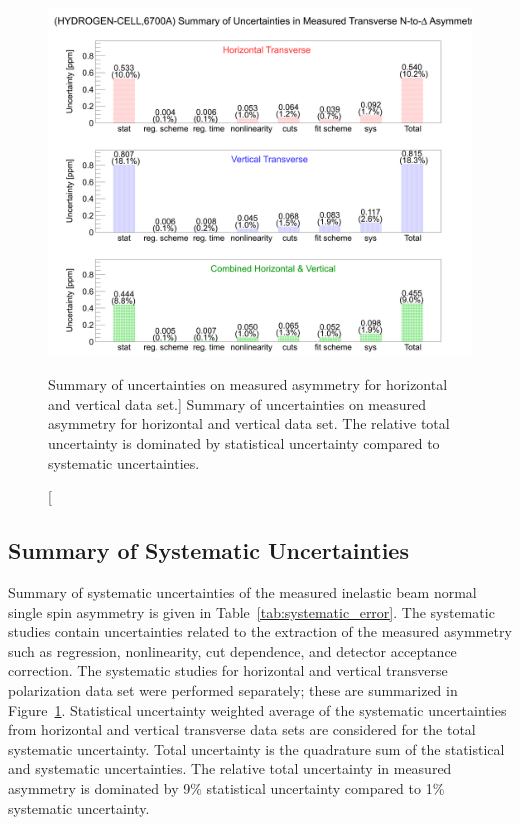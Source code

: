 \begin{figure}[!h]
	\begin{center}
	\includegraphics[width=15.0cm]{figures/errorChart}
	\end{center}
	\caption
	[Summary of uncertainties on measured asymmetry for horizontal and vertical data set.]
	{Summary of uncertainties on measured asymmetry for horizontal and vertical data set. The relative total uncertainty is dominated by statistical uncertainty compared to systematic uncertainties.}
	\label{fig:errorChart}
\end{figure}

\subsection{Summary of Systematic Uncertainties}
\label{Summary of Systematic Uncertainties}
Summary of systematic uncertainties of the measured inelastic beam normal single spin asymmetry is given in Table~\ref{tab:systematic_error}. The systematic studies contain uncertainties related to the extraction of the measured asymmetry such as regression, nonlinearity, cut dependence, and detector acceptance correction. The systematic studies for horizontal and vertical transverse polarization data set were performed separately; these are summarized in Figure~\ref{fig:errorChart}. Statistical uncertainty weighted average of the systematic uncertainties from horizontal and vertical transverse data sets are considered for the total systematic uncertainty. Total uncertainty is the quadrature sum of the statistical and systematic uncertainties. The relative total uncertainty in measured asymmetry is dominated by 9\% statistical uncertainty compared to 1\% systematic uncertainty.

